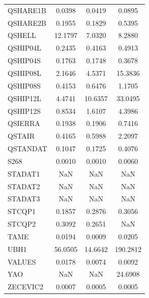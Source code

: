 \begin{longtable}{lccc}
QSHARE1B &   0.0398 &   0.0419 &   0.0895 \\
QSHARE2B &   0.1955 &   0.1829 &   0.5395 \\
QSHELL   &  12.1797 &   7.0320 &   8.2880 \\
QSHIP04L &   0.2435 &   0.4163 &   0.4913 \\
QSHIP04S &   0.1763 &   0.1748 &   0.3678 \\
QSHIP08L &   2.1646 &   4.5371 &  15.3836 \\
QSHIP08S &   0.4153 &   0.6476 &   1.1705 \\
QSHIP12L &   4.4741 &  10.6357 &  33.0495 \\
QSHIP12S &   0.8534 &   1.6107 &   4.3986 \\
QSIERRA  &   0.1938 &   0.1906 &   0.7416 \\
QSTAIR   &   0.4165 &   0.5988 &   2.2097 \\
QSTANDAT &   0.1047 &   0.1725 &   0.4076 \\
S268     &   0.0010 &   0.0010 &   0.0060 \\
STADAT1  &      NaN &      NaN &      NaN \\
STADAT2  &      NaN &      NaN &      NaN \\
STADAT3  &      NaN &      NaN &      NaN \\
STCQP1   &   0.1857 &   0.2876 &   0.3056 \\
STCQP2   &   0.3092 &   0.2651 &      NaN \\
TAME     &   0.0194 &   0.0009 &   0.0205 \\
UBH1     &  56.0505 &  14.6642 & 190.2812 \\
VALUES   &   0.0178 &   0.0074 &   0.0092 \\
YAO      &      NaN &      NaN &  24.6908 \\
ZECEVIC2 &   0.0007 &   0.0005 &   0.0005 \\
\end{longtable}
